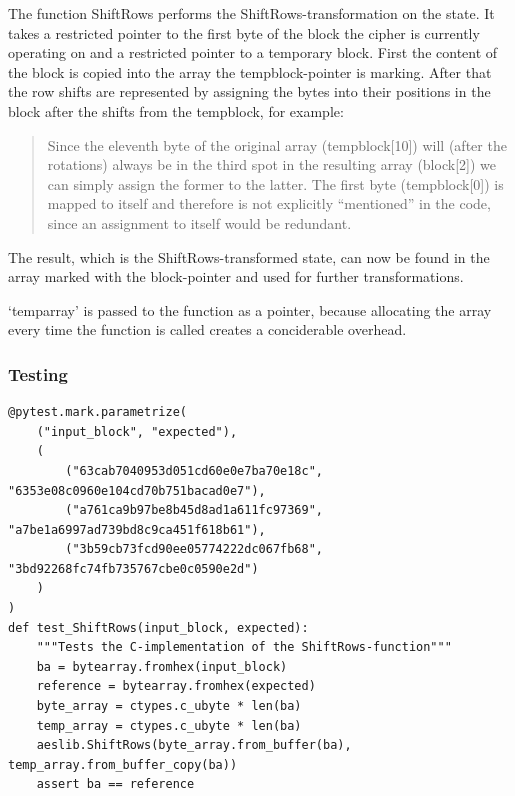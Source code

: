 The function ShiftRows performs the ShiftRows-transformation on the
state. It takes a restricted pointer to the first byte of the block the
cipher is currently operating on and a restricted pointer to a temporary
block. First the content of the block is copied into the array the
tempblock-pointer is marking. After that the row shifts are represented
by assigning the bytes into their positions in the block after the
shifts from the tempblock, for example:

\begin{quote}
Since the eleventh byte of the original array (tempblock{[}10{]}) will
(after the rotations) always be in the third spot in the resulting array
(block{[}2{]}) we can simply assign the former to the latter. The first
byte (tempblock{[}0{]}) is mapped to itself and therefore is not
explicitly ``mentioned'' in the code, since an assignment to itself
would be redundant.
\end{quote}

The result, which is the ShiftRows-transformed state, can now be found
in the array marked with the block-pointer and used for further
transformations.

`temparray' is passed to the function as a pointer, because allocating
the array every time the function is called creates a conciderable
overhead.

\hypertarget{testing-3}{%
\subsubsection{Testing}\label{testing-3}}

\begin{lstlisting}
@pytest.mark.parametrize(
    ("input_block", "expected"),
    (
        ("63cab7040953d051cd60e0e7ba70e18c", "6353e08c0960e104cd70b751bacad0e7"),
        ("a761ca9b97be8b45d8ad1a611fc97369", "a7be1a6997ad739bd8c9ca451f618b61"),
        ("3b59cb73fcd90ee05774222dc067fb68", "3bd92268fc74fb735767cbe0c0590e2d")
    )
)
def test_ShiftRows(input_block, expected):
    """Tests the C-implementation of the ShiftRows-function"""
    ba = bytearray.fromhex(input_block)
    reference = bytearray.fromhex(expected)
    byte_array = ctypes.c_ubyte * len(ba)
    temp_array = ctypes.c_ubyte * len(ba)
    aeslib.ShiftRows(byte_array.from_buffer(ba), temp_array.from_buffer_copy(ba))
    assert ba == reference
\end{lstlisting}


